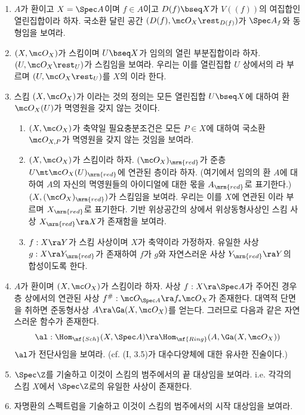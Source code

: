 	
	\begin{enumerate}[label=\tb{2.\arabic*.},itemindent=0mm,itemsep=2mm]
	\item $A$가 환이고 $X=\Spec A$이며 $f\in A$이고 $D(f)\bseq X$가 $V((f))$의 여집합인 열린집합이라 하자.
	국소환 달린 공간 $(D(f),\mc O_X\rest_{D(f)})$가 $\Spec A_f$와 동형임을 보여라.
	\item $(X,\mc O_X)$가 스킴이며 $U\bseq X$가 임의의 열린 부분집합이라 하자.
	$(U,\mc O_X\rest_U)$가 스킴임을 보여라. 우리는 이를 열린집합 $U$ 상에서의 라 부르며
	$(U,\mc O_X\rest_U)$를 $X$의 이라 한다.
	\item {} 스킴 $(X,\mc O_X)$가 이라는 것의 정의는
	모든 열린집합 $U\bseq X$에 대하여 환 $\mc O_X(U)$가 멱영원을 갖지 않는 것이다.
	\begin{enumerate}[label=(\alph*)]
	\item $(X,\mc O_X)$가 축약일 필요충분조건은 모든 $P\in X$에 대하여 국소환 $\mc O_{X,P}$가 멱영원을 갖지 않는 것임을 보여라.
	\item $(X,\mc O_X)$가 스킴이라 하자. $(\mc O_X)_{\mrm{red}}$가 준층 $U\mt\mc O_X(U)_{\mrm{red}}$에 연관된 층이라 하자.
	(여기에서 임의의 환 $A$에 대하여 $A$의 자신의 멱영원들의 아이디얼에 대한 몫을 $A_{\mrm{red}}$로 표기한다.)
	$(X,(\mc O_X)_{\mrm{red}})$가 스킴임을 보여라.
	우리는 이를 $X$에 연관된 이라 부르며 $X_{\mrm{red}}$로 표기한다.
	기반 위상공간의 상에서 위상동형사상인 스킴 사상 $X_{\mrm{red}}\ra X$가 존재함을 보여라.
	\item $f:X\ra Y$가 스킴 사상이며 $X$가 축약이라 가정하자.
	유일한 사상 $g:X\ra Y_{\mrm{red}}$가 존재하여 $f$가 $g$와 자연스러운 사상 $Y_{\mrm{red}}\ra Y$의 합성이도록 한다.
	\end{enumerate}
	\item $A$가 환이며 $(X,\mc O_X)$가 스킴이라 하자. 사상 $f:X\ra\Spec A$가 주어진 경우
	층 상에서의 연관된 사상 $f^\#:\mc O_{\Spec A}\ra f_*\mc O_X$가 존재한다.
	대역적 단면을 취하면 준동형사상 $A\ra\Ga(X,\mc O_X)$를 얻는다. 그러므로 다음과 같은 자연스러운 함수가 존재한다.
	$$\al:\Hom_{\mf{Sch}}(X,\Spec A)\ra\Hom_{\mf{Ring}}(A,\Ga(X,\mc O_X))$$
	$\al$가 전단사임을 보여라. (cf. (I, 3.5)가 대수다양체에 대한 유사한 진술이다.)
	\item $\Spec\Z$를 기술하고 이것이 스킴의 범주에서의 끝 대상임을 보여라.
	i.e. 각각의 스킴 $X$에서 $\Spec\Z$로의 유일한 사상이 존재한다.
	\item 자명환의 스펙트럼을 기술하고 이것이 스킴의 범주에서의 시작 대상임을 보여라.

\end{enumerate}

